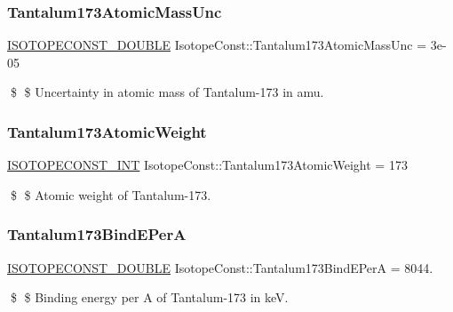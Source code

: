 \subsubsection{\texorpdfstring{Tantalum173\+Atomic\+Mass\+Unc}{Tantalum173AtomicMassUnc}}
{\footnotesize\ttfamily \mbox{\hyperlink{group___isotope_const-_macros_ga8f45a7272ce02c0b4c65c44636ed719a}{I\+S\+O\+T\+O\+P\+E\+C\+O\+N\+S\+T\+\_\+\+D\+O\+U\+B\+LE}} Isotope\+Const\+::\+Tantalum173\+Atomic\+Mass\+Unc = 3e-\/05}

\$ \$ Uncertainty in atomic mass of Tantalum-\/173 in amu. \mbox{\label{group___isotope_const-_tantalum-_ta173_ga9d125ad81d8172541324afe17d164ff3}} 
\subsubsection{\texorpdfstring{Tantalum173\+Atomic\+Weight}{Tantalum173AtomicWeight}}
{\footnotesize\ttfamily \mbox{\hyperlink{group___isotope_const-_macros_ga5f18360b3e99483a35c32d789e62621c}{I\+S\+O\+T\+O\+P\+E\+C\+O\+N\+S\+T\+\_\+\+I\+NT}} Isotope\+Const\+::\+Tantalum173\+Atomic\+Weight = 173}

\$ \$ Atomic weight of Tantalum-\/173. \mbox{\label{group___isotope_const-_tantalum-_ta173_gadc58e4e94a5013623d16cc184eb4068a}} 
\subsubsection{\texorpdfstring{Tantalum173\+Bind\+E\+PerA}{Tantalum173BindEPerA}}
{\footnotesize\ttfamily \mbox{\hyperlink{group___isotope_const-_macros_ga8f45a7272ce02c0b4c65c44636ed719a}{I\+S\+O\+T\+O\+P\+E\+C\+O\+N\+S\+T\+\_\+\+D\+O\+U\+B\+LE}} Isotope\+Const\+::\+Tantalum173\+Bind\+E\+PerA = 8044.}

\$ \$ Binding energy per A of Tantalum-\/173 in keV. \mbox{\label{group___isotope_const-_tantalum-_ta173_ga8321f33ebb4da9c6d756adb0cd599e77}} 
